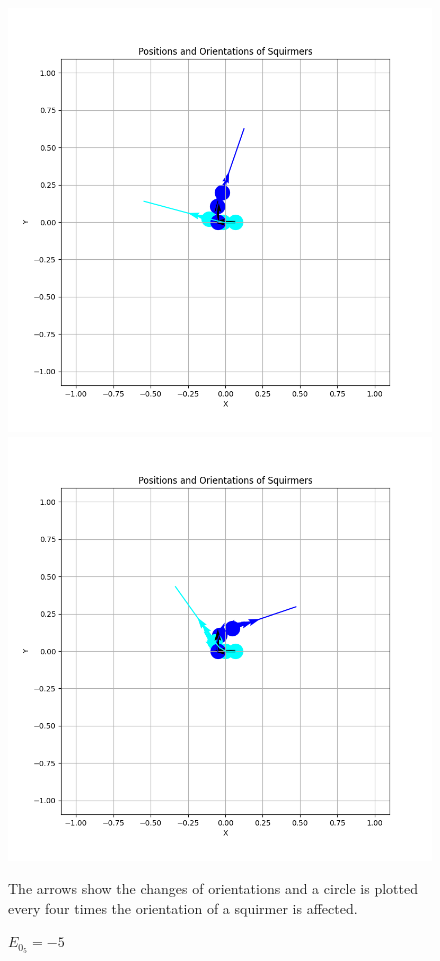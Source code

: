\documentclass{article}
\begin{document}
\begin{figure}[H]
    \centering
    \begin{minipage}{0.49\textwidth}
        \includegraphics[width=1\textwidth]{graphs/Eo_analysis/beta0/pi_/pi_m2.png}
        \caption{\footnotesize $E_{0_{7}}=-2$}
    \end{minipage}\hfill
    \begin{minipage}{0.49\textwidth}
        \includegraphics[width=1\textwidth]{graphs/Eo_analysis/beta0/pi_/pi_m5.png}
        \caption{\footnotesize $E_{0_{5}}=-5$}
    \end{minipage}
    The arrows show the changes of orientations and a circle is plotted every four times the orientation of a squirmer is affected.
\end{figure}
\end{document}

